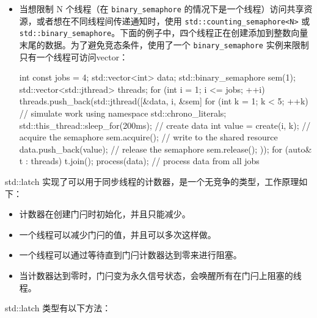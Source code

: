 \begin{itemize}
\item
当想限制 N 个线程（在 \verb|binary_semaphore| 的情况下是一个线程）访问共享资源，或者想在不同线程间传递通知时，使用 \verb|std::counting_semaphore<N>| 或 \verb|std::binary_semaphore|。下面的例子中，四个线程正在创建添加到整数向量末尾的数据。为了避免竞态条件，使用了一个 \verb|binary_semaphore| 实例来限制只有一个线程可访问vector：

\begin{cpp}
int const jobs = 4;
std::vector<int> data;
std::binary_semaphore sem(1);
std::vector<std::jthread> threads;
for (int i = 1; i <= jobs; ++i)
{
    threads.push_back(std::jthread([&data, i, &sem] {
        for (int k = 1; k < 5; ++k)
        {
            // simulate work
            using namespace std::chrono_literals;
            std::this_thread::sleep_for(200ms);
            // create data
            int value = create(i, k);
            // acquire the semaphore
            sem.acquire();
            // write to the shared resource
            data.push_back(value);
            // release the semaphore
            sem.release();
        }
    }));
}
for (auto& t : threads) t.join();
process(data); // process data from all jobs
\end{cpp}
\end{itemize}


std::latch 实现了可以用于同步线程的计数器，是一个无竞争的类型，工作原理如下：

\begin{itemize}
\item
计数器在创建门闩时初始化，并且只能减少。

\item
一个线程可以减少门闩的值，并且可以多次这样做。

\item
一个线程可以通过等待直到门闩计数器达到零来进行阻塞。

\item
当计数器达到零时，门闩变为永久信号状态，会唤醒所有在门闩上阻塞的线程。
\end{itemize}

std::latch 类型有以下方法：

